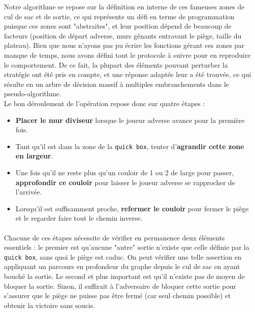 \documentclass[a4paper]{article}
\begin{document}
Notre algorithme se repose sur la définition en interne de ces fameuses zones de cul de sac et de sortie, ce qui représente un défi en terme de programmation puisque ces zones sont "abstraites", et leur position dépend de beaucoup de facteurs (position de départ adverse, murs gênants entravant le piège, taille du plateau). Bien que nous n'ayons pas pu écrire les fonctions gérant ces zones par manque de temps, nous avons défini tout le protocole à suivre pour en reproduire le comportement. De ce fait, la plupart des éléments pouvant perturber la stratégie ont été pris en compte, et une réponse adaptée leur a été trouvée, ce qui résulte en un arbre de décision massif à multiples embranchements dans le pseudo-algorithme. \\

Le bon déroulement de l'opération repose donc sur quatre étapes :

\begin{itemize}
    \item \textbf{Placer le mur diviseur} lorsque le joueur adverse avance pour la première fois.
    \item Tant qu'il est dans la zone de la \texttt{quick box}, tenter d'\textbf{agrandir cette zone en largeur}.
    \item Une fois qu'il ne reste plus qu'un couloir de 1 ou 2 de large pour passer, \textbf{approfondir ce couloir} pour laisser le joueur adverse se rapprocher de l'arrivée.
    \item Lorsqu'il est suffisamment proche, \textbf{refermer le couloir} pour fermer le piège et le regarder faire tout le chemin inverse.
\end{itemize}

\paragraph{}
Chacune de ces étapes nécessite de vérifier en permanence deux éléments essentiels : le premier est qu'aucune "autre" sortie n'existe que celle définie par la \texttt{quick box}, sans quoi le piège est caduc. On peut vérifier une telle assertion en appliquant un parcours en profondeur du graphe depuis le cul de sac en ayant bouché la sortie. Le second et plus important est qu'il n'existe pas de moyen de bloquer la sortie. Sinon, il suffirait à l'adversaire de bloquer cette sortie pour s'assurer que le piège ne puisse pas être fermé (car seul chemin possible) et obtenir la victoire sans soucis. \\
\end{document}
